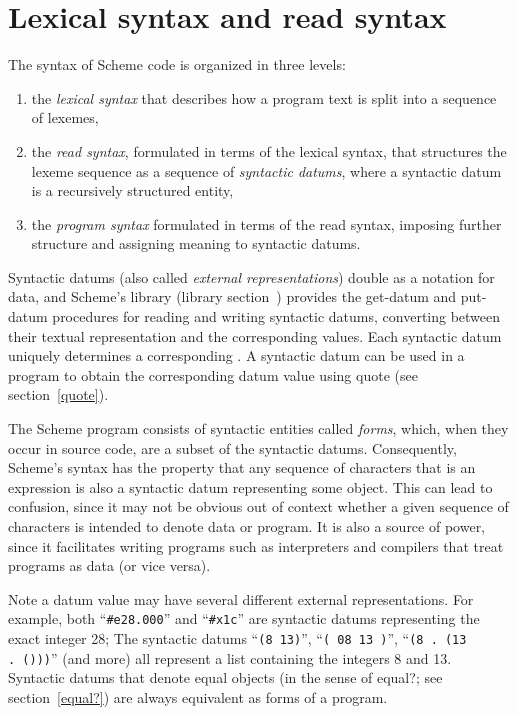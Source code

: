 \chapter{Lexical syntax and read syntax}
\label{readsyntaxchapter}

The syntax of Scheme code is organized in three levels:
%
\begin{enumerate}
\item the \textit{lexical syntax} that describes how a program text is split
  into a sequence of lexemes,
\item the \textit{read syntax}, formulated in terms of the lexical
  syntax, that structures the lexeme sequence as a sequence of
  \textit{syntactic datums}, where a syntactic datum is
    a recursively structured entity,
\item the \textit{program syntax} formulated in terms of the read
  syntax, imposing further structure and assigning meaning to
  syntactic datums.
\end{enumerate}
%
Syntactic datums (also called \textit{external
  representations}) double
as a notation for data, and Scheme's  library
(library section~)
provides the {\cf get-datum} and {\cf put-datum} procedures
for reading and writing syntactic datums, converting between their
textual representation and the corresponding values. 
Each syntactic datum uniquely determines a corresponding .
A syntactic datum can be used in a program to obtain the corresponding
datum value using {\cf quote} (see section~\ref{quote}).

The Scheme program consists of syntactic entities called
\textit{forms}, which, when they occur in source code, 
are a subset of the syntactic datums.
Consequently, Scheme's syntax has the property that any sequence of
characters that is an expression is also a syntactic datum representing
some object.  This can lead to confusion, since it may not be obvious
out of context whether a given sequence of characters is intended to
denote data or program. It is also a source of power, since it
facilitates writing programs such as interpreters and compilers that
treat programs as data (or vice versa).

Note a datum value may have several different external representations.
For example, both ``{\tt \#e28.000}'' and
``{\tt\#x1c}'' are syntactic datums representing the exact integer 28;
The syntactic datums ``{\tt(8 13)}'', ``{\tt( 08 13 )}'', ``{\tt(8 .\
  (13 .\ ()))}'' (and more)
all represent a list containing the integers 8 and 13. 
Syntactic datums that denote equal objects (in the sense of {\cf
  equal?}; see section~\ref{equal?}) are always equivalent 
as forms of a program.

